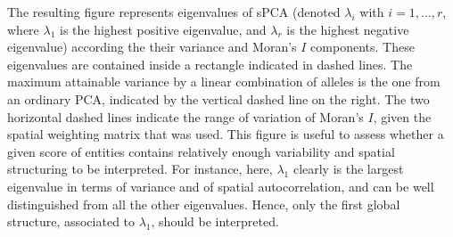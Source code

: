 \documentclass{article}
\begin{document}
\noindent The resulting figure represents eigenvalues of sPCA (denoted
$\lambda_i$ with $i=1,\ldots,r$, where $\lambda_1$ is the highest
positive eigenvalue, and $\lambda_{r}$ is the highest negative
eigenvalue) according the their variance and Moran's $I$ components.
These eigenvalues are contained inside a rectangle indicated in dashed
lines.
The maximum attainable variance by a linear combination of alleles is
the one from an ordinary PCA, indicated by the vertical dashed line on
the right.
The two horizontal dashed lines indicate the range of variation of
Moran's $I$, given the spatial weighting matrix that was used.
This figure is useful to assess whether a given score of entities contains
relatively enough variability and spatial structuring to be interpreted.
For instance, here, $\lambda_1$ clearly is the largest eigenvalue in
terms of variance and of spatial autocorrelation, and can be well
distinguished from all the other eigenvalues.
Hence, only the first global structure, associated to $\lambda_1$, should be interpreted.
\\
\end{document}
